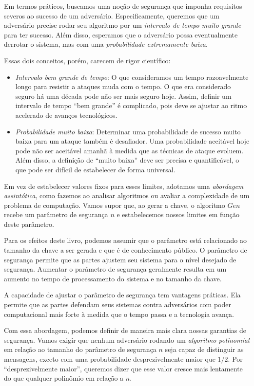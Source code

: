 Em termos práticos, buscamos uma noção de segurança que imponha requisitos severos ao sucesso de um adversário.
Especificamente, queremos que um adversário precise rodar seu algoritmo por um {\em intervalo de tempo muito grande} para ter sucesso.
Além disso, esperamos que o adversário possa eventualmente derrotar o sistema, mas com uma {\em probabilidade extremamente baixa}.

Essas dois conceitos, porém, carecem de rigor científico:

\begin{itemize}
\item[] {\em Intervalo bem grande de tempo}:
  O que consideramos um tempo razoavelmente longo para resistir a ataques muda com o tempo.
  O que era considerado seguro há uma década pode não ser mais seguro hoje.
  Assim, definir um intervalo de tempo ``bem grande'' é complicado, pois deve se ajustar ao ritmo acelerado de avanços tecnológicos.

\item[] {\em Probabilidade muito baixa}:
  Determinar uma probabilidade de sucesso muito baixa para um ataque também é desafiador.
  Uma probabilidade aceitável hoje pode não ser aceitável amanhã à medida que as técnicas de ataque evoluem.
  Além disso, a definição de ``muito baixa'' deve ser precisa e quantificável, o que pode ser difícil de estabelecer de forma universal.
\end{itemize}

Em vez de estabelecer valores fixos para esses limites, adotamos uma {\em abordagem assintótica}, como fazemos ao analisar algoritmos ou avaliar a complexidade de um problema de computação.
Vamos supor que, ao gerar a chave, o algoritmo $Gen$ recebe um parâmetro de segurança $n$ e estabelecemos nossos limites em função deste parâmetro.

Para os efeitos deste livro, podemos assumir que o parâmetro está relacionado ao tamanho da chave a ser gerada e que é de conhecimento público.
O parâmetro de segurança permite que as partes ajustem seu sistema para o nível desejado de segurança.
Aumentar o parâmetro de segurança geralmente resulta em um aumento no tempo de processamento do sistema e no tamanho da chave.

A capacidade de ajustar o parâmetro de segurança tem vantagens práticas.
Ela permite que as partes defendam seus sistemas contra adversários com poder computacional mais forte à medida que o tempo passa e a tecnologia avança.


Com essa abordagem, podemos definir de maneira mais clara nossas garantias de segurança.
Vamos exigir que nenhum adversário rodando um {\em algoritmo polinomial} em relação ao tamanho do parâmetro de segurança $n$ seja capaz de distinguir as mensagens, exceto com uma probabilidade desprezivelmente maior que $1/2$.
Por ``desprezivelmente maior'', queremos dizer que esse valor cresce mais lentamente do que qualquer polinômio em relação a $n$.


